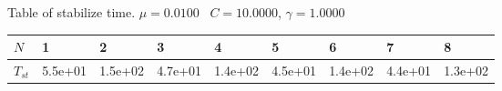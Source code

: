 \begin{center}
Table of stabilize time. $\mu = 0.0100$ \, $C = 10.0000$, $\gamma = 1.0000$
  
\begin{tabular}{|p{0.6in}|p{0.6in}|p{0.6in}|p{0.6in}|p{0.6in}|p{0.6in}|p{0.6in}|p{0.6in}|p{0.6in}|} \hline
$N$ &1 &2 &3 &4 &5 &6 &7 &8 \\ \hline 
$T_{st}$ &5.5e+01 &1.5e+02 &4.7e+01 &1.4e+02 &4.5e+01 &1.4e+02 &4.4e+01 &1.3e+02 \\ \hline 

\end{tabular}\\[20pt]
\end{center}
